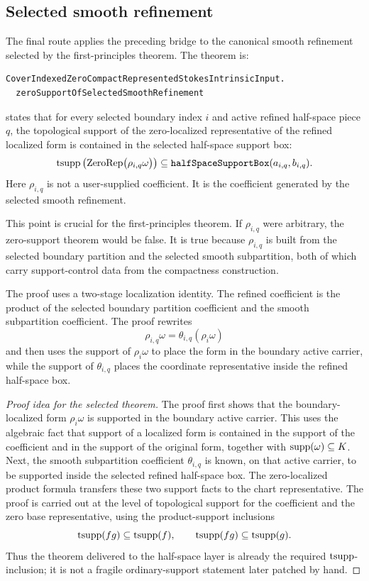 \subsection{Selected smooth refinement}

The final route applies the preceding bridge to the canonical smooth
refinement selected by the first-principles theorem.  The theorem is:
\begin{lstlisting}[language=Lean]
CoverIndexedZeroCompactRepresentedStokesIntrinsicInput.
  zeroSupportOfSelectedSmoothRefinement
\end{lstlisting}
states that for every selected boundary index \(i\) and active refined
half-space piece \(q\), the topological support of the zero-localized
representative of the refined localized form is contained in the selected
half-space support box:
\[
\tsupp
  \left(
    \operatorname{ZeroRep}
    \bigl(\rho_{i,q}\omega\bigr)
  \right)
  \subseteq
  \code{halfSpaceSupportBox}(a_{i,q},b_{i,q}).
\]
Here \(\rho_{i,q}\) is not a user-supplied coefficient.  It is the coefficient
generated by the selected smooth refinement.

This point is crucial for the first-principles theorem.  If \(\rho_{i,q}\)
were arbitrary, the zero-support theorem would be false.  It is true because
\(\rho_{i,q}\) is built from the selected boundary partition and the selected
smooth subpartition, both of which carry support-control data from the
compactness construction.

The proof uses a two-stage localization identity.  The refined coefficient is
the product of the selected boundary partition coefficient and the smooth
subpartition coefficient.  The proof rewrites
\[
  \rho_{i,q}\omega
  =
  \theta_{i,q}(\rho_i\omega)
\]
and then uses the support of \(\rho_i\omega\) to place the form in the
boundary active carrier, while the support of \(\theta_{i,q}\) places the
coordinate representative inside the refined half-space box.

\begin{proof}[Proof idea for the selected theorem]
The proof first shows that the boundary-localized form \(\rho_i\omega\) is
supported in the boundary active carrier.  This uses the algebraic fact that
support of a localized form is contained in the support of the coefficient and
in the support of the original form, together with
\(\operatorname{supp}(\omega)\subseteq K\).  Next, the smooth subpartition coefficient
\(\theta_{i,q}\) is known, on that active carrier, to be supported inside the
selected refined half-space box.  The zero-localized product formula transfers
these two support facts to the chart representative.  The proof is carried out
at the level of topological support for the coefficient and the zero base
representative, using the product-support inclusions
\[
  \operatorname{tsupp}(fg)\subseteq\operatorname{tsupp}(f),
  \qquad
  \operatorname{tsupp}(fg)\subseteq\operatorname{tsupp}(g).
\]
Thus the theorem delivered to the half-space layer is already the required
\(\operatorname{tsupp}\)-inclusion; it is not a fragile ordinary-support statement later
patched by hand.
\end{proof}

